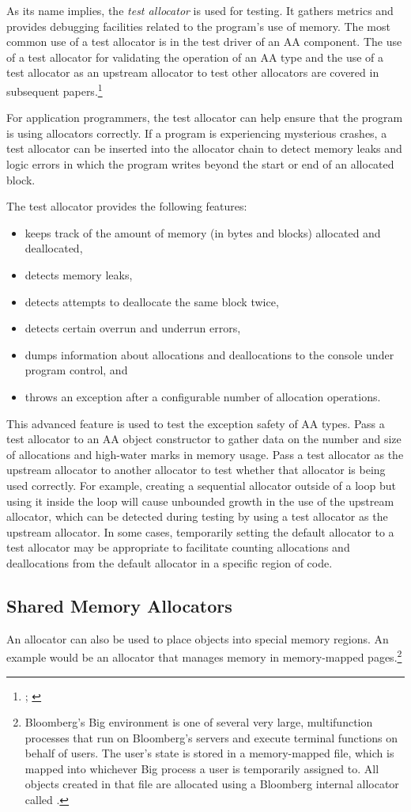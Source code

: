 As its name implies, the \emph{test allocator} is used for testing. It gathers metrics and
provides debugging facilities related to the program’s use of memory. The most
common use of a test allocator is in the test driver of an AA component. The
use of a test allocator for validating the operation of an AA type and the use of
a test allocator as an upstream allocator to test other allocators are covered in
subsequent papers.\footnote{\cite{halpern20b}; \cite{weis20}}

For application programmers, the test allocator can help ensure that the
program is using allocators correctly. If a program is experiencing mysterious
crashes, a test allocator can be inserted into the allocator chain to detect
memory leaks and logic errors in which the program writes beyond the start or
end of an allocated block.

The test allocator provides the following features:
\begin{itemize}
\item keeps track of the amount of memory (in bytes and blocks) allocated and
deallocated,
\item detects memory leaks,
\item detects attempts to deallocate the same block twice,
\item  detects certain overrun and underrun errors,
\item  dumps information about allocations and deallocations to the console
under program control, and
\item throws an exception after a configurable number of allocation operations.
\end{itemize}
This advanced feature is used to test the exception safety of AA types.
Pass a test allocator to an AA object constructor to gather data on the number
and size of allocations and high-water marks in memory usage. Pass a test
allocator as the upstream allocator to another allocator to test whether that
allocator is being used correctly. For example, creating a sequential allocator
outside of a loop but using it inside the loop will cause unbounded growth in
the use of the upstream allocator, which can be detected during testing by
using a test allocator as the upstream allocator. In some cases, temporarily
setting the default allocator to a test allocator may be appropriate to facilitate
counting allocations and deallocations from the default allocator in a specific
region of code.

\subsection{Shared Memory Allocators}
An allocator can also be used to place objects into special memory regions. An
example would be an allocator that manages memory in memory-mapped
pages.\footnote{Bloomberg’s Big environment is one of several very large, multifunction processes that run
on Bloomberg’s servers and execute terminal functions on behalf of users. The user’s state is
stored in a memory-mapped file, which is mapped into whichever Big process a user is
temporarily assigned to. All objects created in that file are allocated using a Bloomberg internal
allocator called .}


